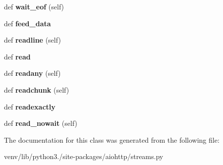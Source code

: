 \begin{DoxyCompactItemize}
\mbox{\label{classaiohttp_1_1streams_1_1_empty_stream_reader_af7e54e1ece7caa42ba5b5740cb508fec}} 
def {\bfseries wait\+\_\+eof} (self)
\item 
\mbox{\label{classaiohttp_1_1streams_1_1_empty_stream_reader_a6561b0243dedc09797407770ea2ca4db}} 
def {\bfseries feed\+\_\+data}
\item 
\mbox{\label{classaiohttp_1_1streams_1_1_empty_stream_reader_a4e0f6944af7a7a78d286d6b68205a621}} 
def {\bfseries readline} (self)
\item 
\mbox{\label{classaiohttp_1_1streams_1_1_empty_stream_reader_a48cc43c8002868b28f135dd9594bd786}} 
def {\bfseries read}
\item 
\mbox{\label{classaiohttp_1_1streams_1_1_empty_stream_reader_aa0605447f9b8f5d0caf06fd9fb3741c9}} 
def {\bfseries readany} (self)
\item 
\mbox{\label{classaiohttp_1_1streams_1_1_empty_stream_reader_a3ee7a30924bd657ee174c99ee243bc0f}} 
def {\bfseries readchunk} (self)
\item 
\mbox{\label{classaiohttp_1_1streams_1_1_empty_stream_reader_ac673a37d16785c3316e675bbadf65c9f}} 
def {\bfseries readexactly}
\item 
\mbox{\label{classaiohttp_1_1streams_1_1_empty_stream_reader_a0d49cd38f15c21a305104605bd8a1026}} 
def {\bfseries read\+\_\+nowait} (self)
\end{DoxyCompactItemize}


The documentation for this class was generated from the following file\+:\begin{DoxyCompactItemize}
\item 
venv/lib/python3./site-\/packages/aiohttp/streams.\+py\end{DoxyCompactItemize}

